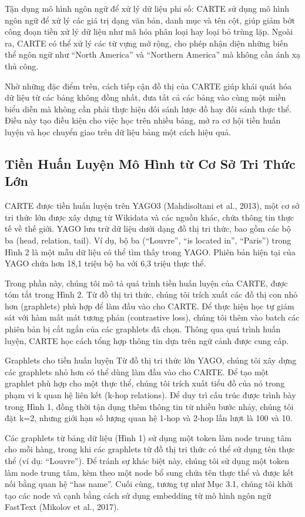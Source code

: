 \documentclass{article}
\begin{document}
Tận dụng mô hình ngôn ngữ để xử lý dữ liệu phi số: CARTE sử dụng mô hình ngôn ngữ để xử lý các giá trị dạng văn bản, danh mục và tên cột, giúp giảm bớt công đoạn tiền xử lý dữ liệu như mã hóa phân loại hay loại bỏ trùng lặp. Ngoài ra, CARTE có thể xử lý các từ vựng mở rộng, cho phép nhận diện những biến thể ngôn ngữ như “North America” và “Northern America” mà không cần ánh xạ thủ công.

Nhờ những đặc điểm trên, cách tiếp cận đồ thị của CARTE giúp khái quát hóa dữ liệu từ các bảng không đồng nhất, đưa tất cả các bảng vào cùng một miền biểu diễn mà không cần phải thực hiện đối sánh lược đồ hay đối sánh thực thể. Điều này tạo điều kiện cho việc học trên nhiều bảng, mở ra cơ hội tiền huấn luyện và học chuyển giao trên dữ liệu bảng một cách hiệu quả.


\subsection{Tiền Huấn Luyện Mô Hình từ Cơ Sở Tri Thức Lớn}
CARTE được tiền huấn luyện trên YAGO3 (Mahdisoltani et al., 2013), một cơ sở tri thức lớn được xây dựng từ Wikidata và các nguồn khác, chứa thông tin thực tế về thế giới. YAGO lưu trữ dữ liệu dưới dạng đồ thị tri thức, bao gồm các bộ ba (head, relation, tail). Ví dụ, bộ ba (“Louvre”, “is located in”, “Paris”) trong Hình 2 là một mẫu dữ liệu có thể tìm thấy trong YAGO. Phiên bản hiện tại của YAGO chứa hơn 18,1 triệu bộ ba với 6,3 triệu thực thể.

Trong phần này, chúng tôi mô tả quá trình tiền huấn luyện của CARTE, được tóm tắt trong Hình 2. Từ đồ thị tri thức, chúng tôi trích xuất các đồ thị con nhỏ hơn (graphlets) phù hợp để làm đầu vào cho CARTE. Để thực hiện học tự giám sát với hàm mất mát tương phản (contrastive loss), chúng tôi thêm vào batch các phiên bản bị cắt ngắn của các graphlets đã chọn. Thông qua quá trình huấn luyện, CARTE học cách tổng hợp thông tin dựa trên ngữ cảnh được cung cấp.

Graphlets cho tiền huấn luyện
Từ đồ thị tri thức lớn YAGO, chúng tôi xây dựng các graphlets nhỏ hơn có thể dùng làm đầu vào cho CARTE. Để tạo một graphlet phù hợp cho một thực thể, chúng tôi trích xuất tiểu đồ của nó trong phạm vi k quan hệ liên kết (k-hop relations). Để duy trì cấu trúc được trình bày trong Hình 1, đồng thời tận dụng thêm thông tin từ nhiều bước nhảy, chúng tôi đặt k=2, nhưng giới hạn số lượng quan hệ 1-hop và 2-hop lần lượt là 100 và 10.

Các graphlets từ bảng dữ liệu (Hình 1) sử dụng một token làm node trung tâm cho mỗi hàng, trong khi các graphlets từ đồ thị tri thức có thể sử dụng tên thực thể (ví dụ: “Louvre”). Để tránh sự khác biệt này, chúng tôi sử dụng một token làm node trung tâm, kèm theo một node bổ sung chứa tên thực thể và được kết nối bằng quan hệ “has name”. Cuối cùng, tương tự như Mục 3.1, chúng tôi khởi tạo các node và cạnh bằng cách sử dụng embedding từ mô hình ngôn ngữ FastText (Mikolov et al., 2017).
\end{document}
